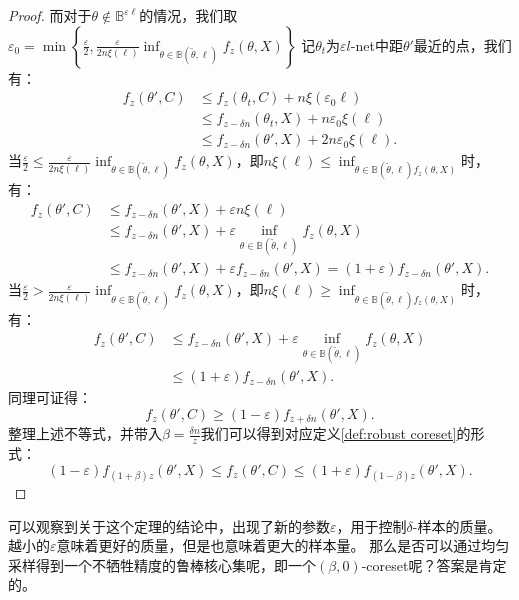 \begin{proof}
而对于$\theta\notin\mathbb{B}^{\varepsilon \ell}$的情况，我们取$\varepsilon_0=\min\left\{\frac{\varepsilon}{2}, \frac{\varepsilon}{2n\xi(\ell)}\inf_{\theta\in\mathbb{B}(\tilde{\theta},\ell)}f_z(\theta,X)\right\}$
记$\theta_t$为$\varepsilon l$-net中距$\theta'$最近的点，我们有：
\begin{align*}
    f_z(\theta',C)&\leq f_z(\theta_t,C)+n\xi(\varepsilon_0\ell)\\
    &\leq f_{z-\delta n}(\theta_t,X)+n\varepsilon_0\xi(\ell)\\
    &\leq f_{z-\delta n}(\theta',X)+2n\varepsilon_0\xi(\ell).
\end{align*}
当$\frac\varepsilon 2 \le \frac{\varepsilon}{2n\xi(\ell)}\inf_{\theta\in\mathbb{B}(\tilde{\theta},\ell)}f_z(\theta,X)$，即$n\xi(\ell)\le\inf_{\theta\in\mathbb{B}(\tilde{\theta},\ell)f_z(\theta,X)}$时，有：
\begin{align*}
    f_z(\theta',C)&\leq f_{z-\delta n}(\theta',X)+\varepsilon n \xi(\ell)\\
    &\leq f_{z-\delta n}(\theta',X)+\varepsilon \inf_{\theta\in\mathbb{B}(\tilde{\theta},\ell)}f_z(\theta,X)\\
    &\leq f_{z-\delta n}(\theta',X)+\varepsilon f_{z-\delta n}(\theta',X)=(1+\varepsilon)f_{z-\delta n}(\theta',X).
\end{align*}
当$\frac\varepsilon 2 > \frac{\varepsilon}{2n\xi(\ell)}\inf_{\theta\in\mathbb{B}(\tilde{\theta},\ell)}f_z(\theta,X)$，即$n\xi(\ell)\ge\inf_{\theta\in\mathbb{B}(\tilde{\theta},\ell)f_z(\theta,X)}$时，有：
\begin{align*}
    f_z(\theta',C)&\leq f_{z-\delta n}(\theta',X)+\varepsilon \inf_{\theta \in \mathbb{B}(\tilde{\theta},\ell)}f_{z}(\theta,X)\\
    &\leq (1+\varepsilon)f_{z-\delta n}(\theta',X).
\end{align*}
同理可证得：
\begin{equation}
    f_z(\theta',C)\geq (1-\varepsilon)f_{z+\delta n}(\theta',X).
\end{equation}
整理上述不等式，并带入$\beta=\frac{\delta n}{z}$我们可以得到对应定义\ref{def:robust coreset}的形式：
\begin{equation}
    (1-\varepsilon)f_{(1+\beta)z}(\theta',X) \leq f_z(\theta',C) \leq (1+\varepsilon)f_{(1-\beta)z}(\theta',X).
\end{equation}

\end{proof}

可以观察到关于这个定理的结论中，出现了新的参数$\varepsilon$，用于控制$\delta$-样本的质量。越小的$\varepsilon$意味着更好的质量，但是也意味着更大的样本量。
那么是否可以通过均匀采样得到一个不牺牲精度的鲁棒核心集呢，即一个$(\beta,0)$-coreset呢？答案是肯定的。

